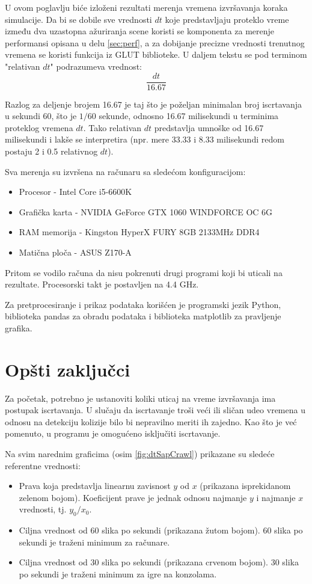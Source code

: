 \documentclass[12pt,oneside]{memoir}
\begin{document}
U ovom poglavlju biće izloženi rezultati merenja vremena izvršavanja koraka simulacije.
Da bi se dobile sve vrednosti $dt$ koje predstavljaju proteklo vreme između dva uzastopna ažuriranja scene
koristi se komponenta za merenje performansi opisana u delu \ref{sec:perf}, a za dobijanje precizne vrednosti trenutnog vremena se koristi funkcija iz GLUT biblioteke.
U daljem tekstu se pod terminom "relativan $dt$" podrazumeva vrednost:
$$ \frac{ dt }{16.67} $$

Razlog za deljenje brojem 16.67 je taj što je poželjan minimalan broj iscrtavanja u sekundi 60, 
što je $1/60$ sekunde, odnosno 16.67 milisekundi u terminima proteklog vremena $dt$.
Tako relativan $dt$ predstavlja umnoške od 16.67 milisekundi i lakše se interpretira
(npr. mere 33.33 i 8.33 milisekundi redom postaju 2 i 0.5 relativnog $dt$).

Sva merenja su izvršena na računaru sa sledećom konfiguracijom:
\begin{itemize}  
	\item Procesor - Intel Core i5-6600K 
	\item Grafička karta - NVIDIA GeForce GTX 1060 WINDFORCE OC 6G
	\item RAM memorija - Kingston HyperX FURY 8GB 2133MHz DDR4 
	\item Matična ploča - ASUS Z170-A
\end{itemize}  
Pritom se vodilo računa da nisu pokrenuti drugi programi koji bi uticali na rezultate.
Procesorski takt je postavljen na 4.4 GHz.

Za pretprocesiranje i prikaz podataka korišćen je programski jezik Python,
biblioteka pandas za obradu podataka i biblioteka matplotlib
za pravljenje grafika.

\section{Opšti zaključci}

Za početak, potrebno je ustanoviti  koliki uticaj na vreme izvršavanja ima postupak iscrtavanja.
U slučaju da iscrtavanje troši veći ili sličan udeo vremena  u odnosu na detekciju kolizije bilo bi nepravilno meriti ih zajedno.
Kao što je već pomenuto, u programu je omogućeno isključiti iscrtavanje.

Na svim narednim graficima (osim \ref{fig:dtSapCrawl}) prikazane su sledeće referentne vrednosti:
\begin{itemize}  
	\item Prava koja predstavlja linearnu zavisnost $y$ od $x$ (prikazana isprekidanom zelenom bojom).
	Koeficijent prave je jednak odnosu najmanje $y$ i najmanje $x$ vrednosti, tj. $y_0/x_0$.
	\item Ciljna vrednost od 60 slika po sekundi (prikazana žutom bojom).
	60 slika po sekundi je traženi minimum za računare.
	\item Ciljna vrednost od 30 slika po sekundi (prikazana crvenom bojom).
	30 slika po sekundi je traženi minimum za igre na konzolama.
\end{itemize}  
\end{document}
